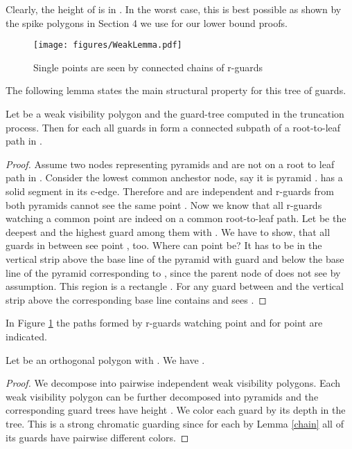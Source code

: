 \documentclass[a4paper,USenglish,numberwithinsect]{lipics}
\theoremstyle{plain}
\begin{document}
Clearly, the height of  is in . In the worst case, this is best possible as shown by the spike
polygons  in Section 4  we use for our lower
bound proofs.


\begin{figure}
\centering
\texttt{[image: figures/WeakLemma.pdf]}
\caption{Single points are seen by connected  chains of r-guards}
\label{guardTree}
\end{figure}


The following lemma states the main structural property for this  tree
of guards.
\begin{lemma}
\label{chain}
Let  be  a weak visibility polygon and  the
guard-tree computed in the truncation process. Then for each 
all guards in   form  a connected subpath of a  root-to-leaf
path in .
\end{lemma}

\begin{proof}
Assume two nodes representing pyramids  and  are not on a root
to leaf path in . Consider the lowest common anchestor node, say it
is pyramid .  has a solid segment in its c-edge. Therefore
 and  are independent and r-guards from both pyramids cannot
see the same point . Now we know that all r-guards watching a common
point  are indeed on a common root-to-leaf path. Let  be the
deepest and  the highest guard among them with . We
have to show, that all guards in between see point , too. Where can
point  be? It has to be in the vertical strip above the base line of
the pyramid with guard  and below the base line of the pyramid
corresponding to , since the parent node of  does not see 
by assumption. This region is a rectangle . For any guard  between 
and  the vertical strip above the corresponding base line contains
 and  sees .  
\end{proof}
In Figure \ref{guardTree} the paths formed by r-guards watching point  and for point 
are indicated.

\begin{theorem}
\label{stTheorem}
Let  be an orthogonal  polygon with . We have
.


\end{theorem}

\begin{proof} We decompose  into pairwise independent weak visibility
polygons. Each weak visibility polygon can be further decomposed into 
pyramids and the corresponding guard trees have height 
. We color each guard by its depth in the tree.
 This is a strong chromatic guarding since for each  by Lemma \ref{chain} all  of its guards have pairwise different colors.
\end{proof}
\end{document}
